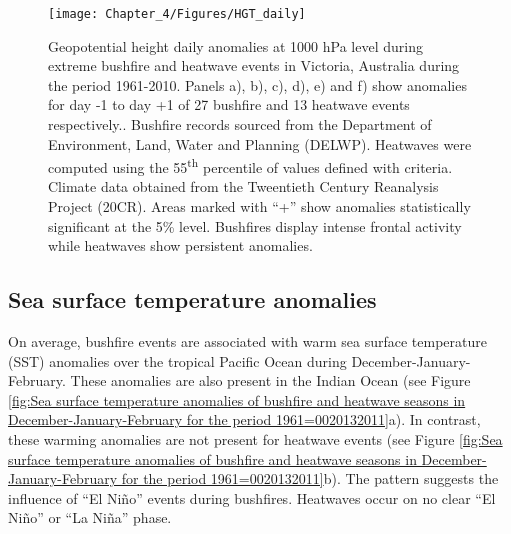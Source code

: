 \begin{figure}[h]
\noindent \begin{centering}
\texttt{[image: Chapter\_4/Figures/HGT\_daily]}
\par\end{centering}

\caption[Geopotential height daily anomalies at 1000 hPa level during extreme
bushfire and heatwave events in Victoria, Australia during the period
1961-2010]{Geopotential height daily anomalies at 1000 hPa level during extreme
bushfire and heatwave events in Victoria, Australia during the period
1961-2010. Panels a), b), c), d), e) and f) show anomalies for day
-1 to day +1 of 27 bushfire and 13 heatwave events respectively..
Bushfire records sourced from the Department of Environment, Land,
Water and Planning (DELWP). Heatwaves were computed using the 55\protect\textsuperscript{th}
percentile of values defined with \citet{Nairn2009} criteria. Climate
data obtained from the Tweentieth Century Reanalysis Project (20CR).
Areas marked with ``+'' show anomalies statistically significant
at the 5\% level. Bushfires display intense frontal activity while
heatwaves show persistent anomalies. \label{fig: Geopotential height daily anomalies at 1000 hPa level during extreme bushfire and heatwave events in Victoria, Australia during the period 1961-2010}}


\end{figure}



\subsection{Sea surface temperature anomalies }

On average, bushfire events are associated with warm sea surface temperature (SST)
anomalies over the tropical Pacific Ocean during December-January-February.
These anomalies are also present in the Indian Ocean (see Figure \ref{fig:Sea surface temperature anomalies of bushfire and heatwave seasons in December-January-February for the period 1961=0020132011}a).
In contrast, these warming anomalies are not present for heatwave
events (see Figure \ref{fig:Sea surface temperature anomalies of bushfire and heatwave seasons in December-January-February for the period 1961=0020132011}b).
The pattern suggests the influence of ``El Ni\~no'' events during
bushfires. Heatwaves occur on no clear ``El Ni\~no'' or ``La Ni\~na'' phase. 


